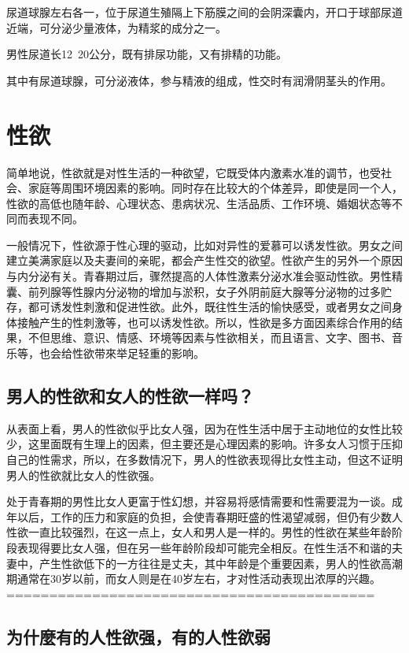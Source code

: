 \documentclass[12pt,UTF8]{ctexbook}
\begin{document}
尿道球腺左右各一，位于尿道生殖隔上下筋膜之间的会阴深囊内，开口于球部尿道近端，可分泌少量液体，为精浆的成分之一。

男性尿道长12~20公分，既有排尿功能，又有排精的功能。

其中有尿道球腺，可分泌液体，参与精液的组成，性交时有润滑阴茎头的作用。

\chapter{性欲}

简单地说，性欲就是对性生活的一种欲望，它既受体内激素水准的调节，也受社会、家庭等周围环境因素的影响。同时存在比较大的个体差异，即使是同一个人，性欲的高低也随年龄、心理状态、患病状况、生活品质、工作环境、婚姻状态等不同而表现不同。

一般情况下，性欲源于性心理的驱动，比如对异性的爱慕可以诱发性欲。男女之间建立美满家庭以及夫妻间的亲昵，都会产生性交的欲望。性欲产生的另外一个原因与内分泌有关。青春期过后，骤然提高的人体性激素分泌水准会驱动性欲。男性精囊、前列腺等性腺内分泌物的增加与淤积，女子外阴前庭大腺等分泌物的过多贮存，都可诱发性刺激和促进性欲。此外，既往性生活的愉快感受，或者男女之间身体接触产生的性刺激等，也可以诱发性欲。所以，性欲是多方面因素综合作用的结果，不但思维、意识、情感、环境等因素与性欲相关，而且语言、文字、图书、音乐等，也会给性欲带來举足轻重的影响。

\section{男人的性欲和女人的性欲一样吗？}

从表面上看，男人的性欲似乎比女人强，因为在性生活中居于主动地位的女性比较少，这里面既有生理上的因素，但主要还是心理因素的影响。许多女人习惯于压抑自己的性需求，所以，在多数情况下，男人的性欲表现得比女性主动，但这不证明男人的性欲就比女人的性欲强。

处于青春期的男性比女人更富于性幻想，并容易将感情需要和性需要混为一谈。成年以后，工作的压力和家庭的负担，会使青春期旺盛的性渴望减弱，但仍有少数人性欲一直比较强烈，在这一点上，女人和男人是一样的。男性的性欲在某些年龄阶段表现得要比女人强，但在另一些年龄阶段却可能完全相反。在性生活不和谐的夫妻中，产生性欲低下的一方往往是丈夫，其中年龄是个重要因素，男人的性欲高潮期通常在30岁以前，而女人则是在40岁左右，才对性活动表现出浓厚的兴趣。
===========================================
\section{为什麼有的人性欲强，有的人性欲弱}
\end{document}
